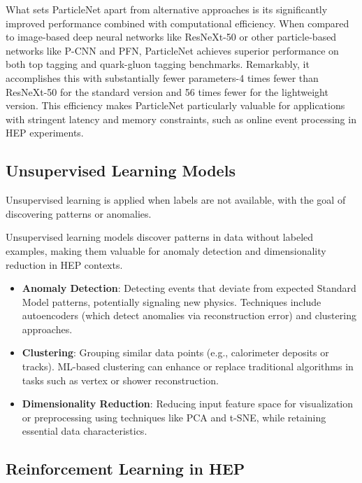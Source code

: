\documentclass[letterpaper,12pt]{article}
\begin{document}
\begin{spacing}{1.125}
What sets ParticleNet apart from alternative approaches is its significantly improved performance combined with computational efficiency. When compared to image-based deep neural networks like ResNeXt-50 or other particle-based networks like P-CNN and PFN, ParticleNet achieves superior performance on both top tagging and quark-gluon tagging benchmarks. Remarkably, it accomplishes this with substantially fewer parameters-4 times fewer than ResNeXt-50 for the standard version and 56 times fewer for the lightweight version. This efficiency makes ParticleNet particularly valuable for applications with stringent latency and memory constraints, such as online event processing in HEP experiments.

\subsection{ Unsupervised Learning Models}

Unsupervised learning is applied when labels are not available, with the goal of discovering patterns or anomalies.

Unsupervised learning models discover patterns in data without labeled examples, making them valuable for anomaly detection and dimensionality reduction in HEP contexts.

\begin{itemize}
    \item \textbf{Anomaly Detection}: Detecting events that deviate from expected Standard Model patterns, potentially signaling new physics. Techniques include autoencoders (which detect anomalies via reconstruction error) and clustering approaches.
    
    \item \textbf{Clustering}: Grouping similar data points (e.g., calorimeter deposits or tracks). ML-based clustering can enhance or replace traditional algorithms in tasks such as vertex or shower reconstruction.
    
    \item \textbf{Dimensionality Reduction}: Reducing input feature space for visualization or preprocessing using techniques like PCA and t-SNE, while retaining essential data characteristics.
\end{itemize}

\subsection{Reinforcement\cite{Reinforcement} Learning in HEP}


\end{spacing}
\end{document}
